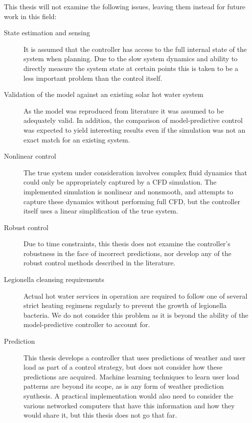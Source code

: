 This thesis will not examine the following issues, leaving them instead for future work in this field:

\begin{description}
   \item[State estimation and sensing]
         It is assumed that the controller has access to the full internal state of the system when planning.
         Due to the slow system dynamics and ability to directly measure the system state at certain points this is taken to be a less important problem than the control itself.

   \item[Validation of the model against an existing solar hot water system]
         As the model was reproduced from literature it was assumed to be adequately valid.
         In addition, the comparison of model-predictive control was expected to yield interesting results even if the simulation was not an exact match for an existing system.

   \item[Nonlinear control]
         The true system under consideration involves complex fluid dynamics that could only be appropriately captured by a CFD simulation.
         The implemented simulation is nonlinear and nonsmooth, and attempts to capture these dynamics without performing full CFD, but the controller itself uses a linear simplification of the true system.

   \item[Robust control]
         Due to time constraints, this thesis does not examine the controller's robustness in the face of incorrect predictions, nor develop any of the robust control methods described in the literature.

   \item[Legionella cleansing requirements]
         Actual hot water services in operation are required to follow one of several strict heating regimens regularly to prevent the growth of legionella bacteria.
         We do not consider this problem as it is beyond the ability of the model-predictive controller to account for.

   \item[Prediction]
         This thesis develops a controller that uses predictions of weather and user load as part of a control strategy, but does not consider how these predictions are acquired.
         Machine learning techniques to learn user load patterns are beyond its scope, as is any form of weather prediction synthesis.
         A practical implementation would also need to consider the various networked computers that have this information and how they would share it, but this thesis does not go that far.
\end{description}

